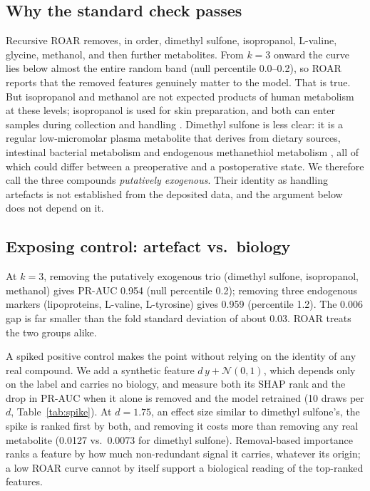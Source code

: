 \documentclass[conference]{IEEEtran}
\newcommand{\verified}[1]{#1}  %
\begin{document}
\subsection{Why the standard check passes}
Recursive ROAR removes, in order, dimethyl sulfone, isopropanol, L-valine,
glycine, methanol, and then further metabolites. From $k=3$ onward the
curve lies below almost the entire random band (null percentile
\verified{0.0--0.2}), so ROAR reports that the removed features genuinely
matter to the model. That is true. But isopropanol and methanol are not
expected products of human metabolism at these levels; isopropanol is used
for skin preparation, and both can enter samples during collection and
handling \cite{bernini2011, vandersar2015}. Dimethyl sulfone is less clear:
it is a regular low-micromolar plasma metabolite that derives from dietary
sources, intestinal bacterial metabolism and endogenous methanethiol
metabolism \cite{engelke2005}, all of which could differ between a
preoperative and a postoperative state. We therefore call the three compounds
\emph{putatively exogenous}. Their identity as handling artefacts is not
established from the deposited data, and the argument below does not depend
on it.

\subsection{Exposing control: artefact vs.\ biology}
At $k=3$, removing the putatively exogenous trio (dimethyl sulfone,
isopropanol, methanol) gives PR-AUC
\verified{0.954} (null percentile \verified{0.2}); removing three endogenous
markers (lipoproteins, L-valine, L-tyrosine) gives \verified{0.959}
(percentile \verified{1.2}). The \verified{0.006} gap is far smaller than the
fold standard deviation of about \verified{0.03}. ROAR treats the two groups
alike.

A spiked positive control makes the point without relying on the identity of
any real compound. We add a synthetic feature $d\,y + \mathcal{N}(0,1)$,
which depends only on the label and carries no biology, and measure both its
SHAP rank and the drop in PR-AUC when it alone is removed and the model
retrained (10 draws per $d$, Table~\ref{tab:spike}). At $d=1.75$, an effect
size similar to dimethyl sulfone's, the spike is ranked first by both, and
removing it costs more than removing any real metabolite (\verified{0.0127}
vs.\ \verified{0.0073} for dimethyl sulfone). Removal-based importance ranks
a feature by how much non-redundant signal it carries, whatever its origin;
a low ROAR curve cannot by itself support a biological reading of the
top-ranked features.
\end{document}
